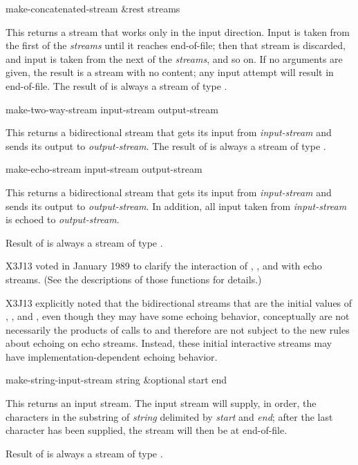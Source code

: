 \begin{defun}[Function]
make-concatenated-stream &rest streams

This returns a stream that works only in the input direction.
Input is taken from the first of the \emph{streams} until it reaches
end-of-file; then that stream is discarded, and input is taken
from the next of the \emph{streams}, and so on.  If no arguments
are given, the result is a stream with no content; any input attempt
will result in end-of-file.
The result of
 is always a stream of type .
\end{defun}

\begin{defun}[Function]
make-two-way-stream input-stream output-stream

This returns a bidirectional stream that gets its input from \emph{input-stream}
and sends its output to \emph{output-stream}.
The result of
 is always a stream of type .
\end{defun}

\begin{defun}[Function]
make-echo-stream input-stream output-stream

This returns a bidirectional stream that gets its input from \emph{input-stream}
and sends its output to \emph{output-stream}.  In addition, all
input taken from \emph{input-stream} is echoed to \emph{output-stream}.

Result of
 is always a stream of type .

\begin{new}
X3J13 voted in January 1989
to clarify the interaction of
, , and  with echo streams.
(See the descriptions of those functions for details.)

X3J13 explicitly noted that the bidirectional streams that are the initial
values of , , and ,
even though they may have some echoing behavior, conceptually
are not necessarily the products of calls to 
and therefore are not subject to the new rules about echoing on echo
streams.  Instead, these initial interactive streams may have
implementation-dependent echoing behavior.
\end{new}
\end{defun}

\begin{defun}[Function]
make-string-input-stream string &optional start end

This returns an input stream.
The input stream will supply, in order, the characters in the substring
of \emph{string} delimited by \emph{start} and \emph{end}; after the last
character has been supplied, the stream will then be at end-of-file.

Result of
 is always a stream of type .
\end{defun}

